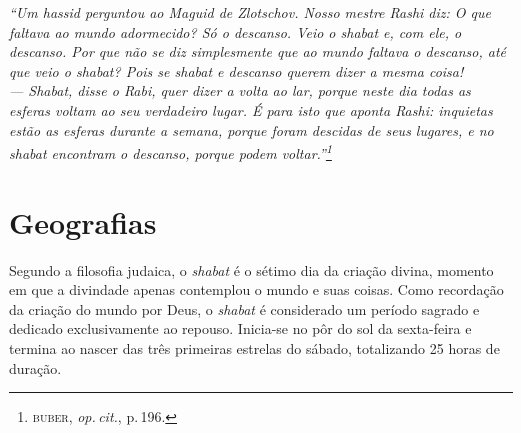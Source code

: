 \pagebreak

{
\thispagestyle{empty}

\mbox{}

\vspace{11cm}

\footnotesize
\noindent{}\emph{\noindent{}``Um \emph{hassid} perguntou ao Maguid de Zlotschov. Nosso mestre Rashi diz: O que faltava ao mundo adormecido? Só o descanso. Veio o \emph{shabat} e, com ele, o descanso. Por que não se diz simplesmente que ao mundo faltava o descanso, até que veio o \emph{shabat}? Pois se \emph{shabat} e descanso querem dizer a mesma coisa!\medskip\\
--- \emph{Shabat}, disse o Rabi, quer dizer a volta ao lar, porque neste
dia todas as esferas voltam ao seu verdadeiro lugar. É para isto que
aponta Rashi: inquietas estão as esferas durante a semana, porque foram
descidas de seus lugares, e no \emph{shabat} encontram o descanso, porque podem
voltar.''\footnote{\textsc{buber}, \emph{op.\,cit.}, p.\,196.}}
}

\pagebreak

\chapter{Geografias}



\noindent{}Segundo a filosofia judaica, o \emph{shabat} é o sétimo dia da criação
divina, momento em que a divindade apenas contemplou o mundo e suas
coisas. Como recordação da criação do mundo por Deus, o \emph{shabat} é
considerado um período sagrado e dedicado exclusivamente ao repouso.
Inicia-se no pôr do sol da sexta-feira e termina ao nascer das três
primeiras estrelas do sábado, totalizando 25 horas de duração.


